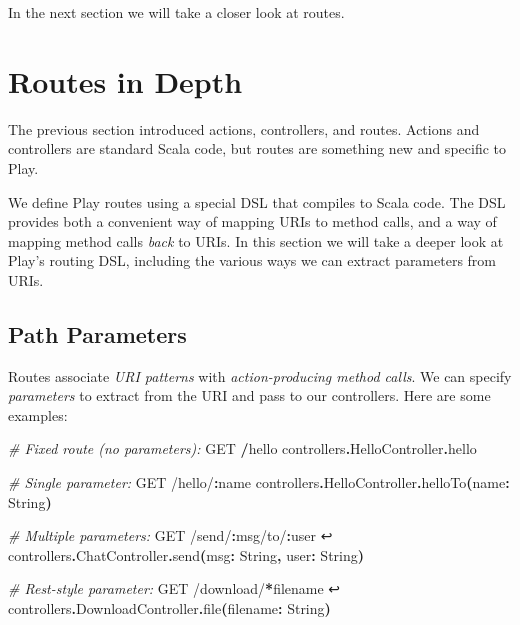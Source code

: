 \documentclass[oneside,11pt,a4paper,]{book}
\newenvironment{Shaded}{\begin{snugshade}}{\end{snugshade}}
\newcommand{\KeywordTok}[1]{\textcolor[rgb]{0.13,0.29,0.53}{\textbf{{#1}}}}
\newcommand{\StringTok}[1]{\textcolor[rgb]{0.31,0.60,0.02}{{#1}}}
\newcommand{\CommentTok}[1]{\textcolor[rgb]{0.56,0.35,0.01}{\textit{{#1}}}}
\newcommand{\OtherTok}[1]{\textcolor[rgb]{0.56,0.35,0.01}{{#1}}}
\newcommand{\NormalTok}[1]{{#1}}
\begin{document}
In the next section we will take a closer look at routes.

\section{Routes in Depth}\label{routes-in-depth}

The previous section introduced actions, controllers, and routes.
Actions and controllers are standard Scala code, but routes are
something new and specific to Play.

We define Play routes using a special DSL that compiles to Scala code.
The DSL provides both a convenient way of mapping URIs to method calls,
and a way of mapping method calls \emph{back} to URIs. In this section
we will take a deeper look at Play's routing DSL, including the various
ways we can extract parameters from URIs.

\subsection{Path Parameters}\label{path-parameters}

Routes associate \emph{URI patterns} with \emph{action-producing method
calls}. We can specify \emph{parameters} to extract from the URI and
pass to our controllers. Here are some examples:

\begin{Shaded}
\begin{Highlighting}[]
\CommentTok{# Fixed route (no parameters):}
\NormalTok{GET }\KeywordTok{/}\NormalTok{hello controllers}\KeywordTok{.}\NormalTok{HelloController}\KeywordTok{.}\NormalTok{hello}

\CommentTok{# Single parameter:}
\NormalTok{GET }\StringTok{/hello/}\KeywordTok{:}\NormalTok{name controllers}\KeywordTok{.}\NormalTok{HelloController}\KeywordTok{.}\NormalTok{helloTo}\KeywordTok{(}\NormalTok{name}\KeywordTok{:} \OtherTok{String}\KeywordTok{)}

\CommentTok{# Multiple parameters:}
\NormalTok{GET }\StringTok{/send/}\KeywordTok{:}\NormalTok{msg}\StringTok{/to/}\KeywordTok{:}\NormalTok{user ↩}
  \NormalTok{controllers}\KeywordTok{.}\NormalTok{ChatController}\KeywordTok{.}\NormalTok{send}\KeywordTok{(}\NormalTok{msg}\KeywordTok{:} \OtherTok{String}\KeywordTok{,} \NormalTok{user}\KeywordTok{:} \OtherTok{String}\KeywordTok{)}

\CommentTok{# Rest-style parameter:}
\NormalTok{GET }\StringTok{/download/}\KeywordTok{*}\NormalTok{filename ↩}
  \NormalTok{controllers}\KeywordTok{.}\NormalTok{DownloadController}\KeywordTok{.}\NormalTok{file}\KeywordTok{(}\NormalTok{filename}\KeywordTok{:} \OtherTok{String}\KeywordTok{)}
\end{Highlighting}
\end{Shaded}
\end{document}
